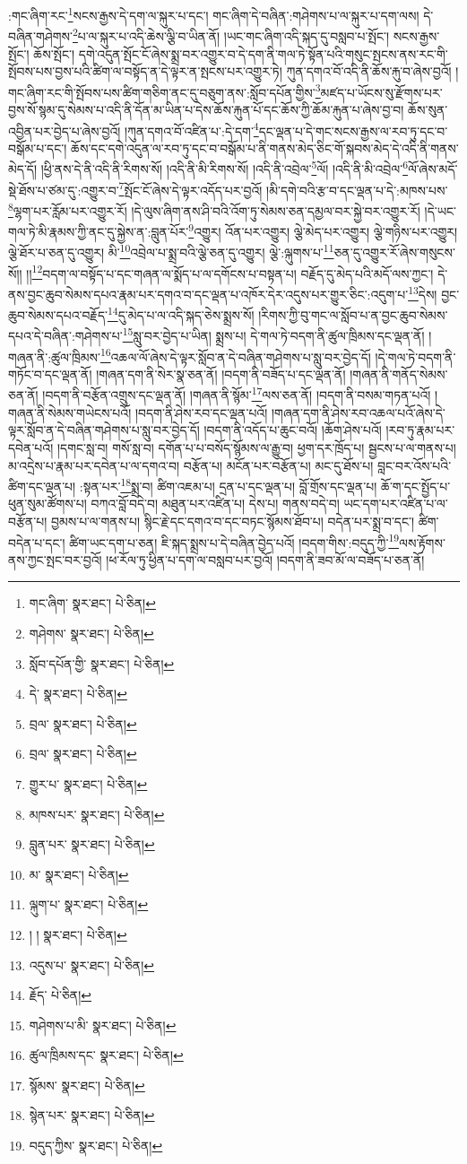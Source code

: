 :གང་ཞིག་རང་\footnote{གང་ཞིག་  སྣར་ཐང་།  པེ་ཅིན། }སངས་རྒྱས་དེ་དག་ལ་སྐུར་པ་དང་། གང་ཞིག་དེ་བཞིན་:གཤེགས་པ་ལ་སྐུར་པ་དག་ལས། དེ་བཞིན་གཤེགས་\footnote{གཤེགས་  སྣར་ཐང་།  པེ་ཅིན། }པ་ལ་སྐུར་པ་འདི་ཆེས་ལྕི་བ་ཡིན་ནོ། །ཡང་གང་ཞིག་འདི་སྐད་དུ་བསླབ་པ་སྤོང་། སངས་རྒྱས་སྤོང་། ཆོས་སྤོང་། དགེ་འདུན་སྤོང་ངོ་ཞེས་སྨྲ་བར་འགྱུར་བ་དེ་དག་ནི་གལ་ཏེ་སྟོན་པའི་གསུང་སྤངས་ནས་རང་གི་སྤོབས་པས་བྱས་པའི་ཚིག་ལ་བསྟོད་ན་དེ་ལྟར་ན་སྤངས་པར་འགྱུར་ཏེ། ཀུན་དགའ་བོ་འདི་ནི་ཆོས་རྐུ་བ་ཞེས་བྱའོ། །གང་ཞིག་རང་གི་སྤོབས་པས་ཚིག་གཅིག་ནང་དུ་བཅུག་ནས་:སློབ་དཔོན་གྱིས་\footnote{སློབ་དཔོན་གྱི་  སྣར་ཐང་།  པེ་ཅིན། }མཛད་པ་ཡོངས་སུ་རྫོགས་པར་བྱས་སོ་སྙམ་དུ་སེམས་པ་འདི་ནི་དོན་མ་ཡིན་པ་དེས་ཆོས་རྐུན་པོ་དང་ཆོས་ཀྱི་ཆོམ་རྐུན་པ་ཞེས་བྱ་བ། ཆོས་སུན་འབྱིན་པར་བྱེད་པ་ཞེས་བྱའོ། །ཀུན་དགའ་བོ་འཛིན་པ་:དེ་དག་\footnote{དེ་  སྣར་ཐང་།  པེ་ཅིན། }དང་ལྡན་པ་དེ་གང་སངས་རྒྱས་ལ་རབ་ཏུ་དང་བ་བསྒོམ་པ་དང་། ཆོས་དང་དགེ་འདུན་ལ་རབ་ཏུ་དང་བ་བསྒོམ་པ་ནི་གནས་མེད་ཅིང་གོ་སྐབས་མེད་དེ་འདི་ནི་གནས་མེད་དོ། །ཕྱི་ནས་དེ་ནི་འདི་ནི་རིགས་སོ། །འདི་ནི་མི་རིགས་སོ། །འདི་ནི་འབྲེལ་\footnote{བྲལ་  སྣར་ཐང་།  པེ་ཅིན། }ལོ། །འདི་ནི་མི་འབྲེལ་\footnote{བྲལ་  སྣར་ཐང་།  པེ་ཅིན། }ལོ་ཞེས་མདོ་སྡེ་ཐོས་པ་ཙམ་དུ་:འགྱུར་བ་\footnote{གྱུར་པ་  སྣར་ཐང་།  པེ་ཅིན། }སྤོང་ངོ་ཞེས་དེ་ལྟར་འདོད་པར་བྱའོ། །མི་དགེ་བའི་རྩ་བ་དང་ལྡན་པ་དེ་:མཁས་པས་\footnote{མཁས་པར་  སྣར་ཐང་།  པེ་ཅིན། }ལྷག་པར་རློམ་པར་འགྱུར་རོ། །དེ་ལུས་ཞིག་ནས་ཤི་བའི་འོག་ཏུ་སེམས་ཅན་དམྱལ་བར་སྐྱེ་བར་འགྱུར་རོ། །དེ་ཡང་གལ་ཏེ་མི་རྣམས་ཀྱི་ནང་དུ་སྐྱེས་ན་:བླུན་པོར་\footnote{བླུན་པར་  སྣར་ཐང་།  པེ་ཅིན། }འགྱུར། འོན་པར་འགྱུར། ལྕེ་མེད་པར་འགྱུར། ལྕེ་གཉིས་པར་འགྱུར། ལྕེ་ཐོར་པ་ཅན་དུ་འགྱུར། མི་\footnote{མ་  སྣར་ཐང་།  པེ་ཅིན། }འབྲེལ་པ་སྨྲ་བའི་ལྕེ་ཅན་དུ་འགྱུར། ལྕེ་:ལྐུགས་པ་\footnote{ལྐུག་པ་  སྣར་ཐང་།  པེ་ཅིན། }ཅན་དུ་འགྱུར་རོ་ཞེས་གསུངས་སོ།། །།\footnote{། །  སྣར་ཐང་།  པེ་ཅིན། }བདག་ལ་བསྟོད་པ་དང་གཞན་ལ་སྨོད་པ་ལ་དགོངས་པ་བསྟན་པ། བརྗོད་དུ་མེད་པའི་མདོ་ལས་ཀྱང་། དེ་ནས་བྱང་ཆུབ་སེམས་དཔའ་རྣམ་པར་དགའ་བ་དང་ལྡན་པ་འཁོར་དེར་འདུས་པར་གྱུར་ཅིང་:འདུག་པ་\footnote{འདུས་པ་  སྣར་ཐང་།  པེ་ཅིན། }དེས། བྱང་ཆུབ་སེམས་དཔའ་བརྗོད་\footnote{རྗོད་  པེ་ཅིན། }དུ་མེད་པ་ལ་འདི་སྐད་ཅེས་སྨྲས་སོ། །རིགས་ཀྱི་བུ་གང་ལ་སློབ་པ་ན་བྱང་ཆུབ་སེམས་དཔའ་དེ་བཞིན་:གཤེགས་པ་\footnote{གཤེགས་པ་མི་  སྣར་ཐང་།  པེ་ཅིན། }སླུ་བར་བྱེད་པ་ཡིན། སྨྲས་པ། དེ་གལ་ཏེ་བདག་ནི་ཚུལ་ཁྲིམས་དང་ལྡན་ནོ། །གཞན་ནི་:ཚུལ་ཁྲིམས་\footnote{ཚུལ་ཁྲིམས་དང་  སྣར་ཐང་།  པེ་ཅིན། }འཆལ་ལོ་ཞེས་དེ་ལྟར་སློབ་ན་དེ་བཞིན་གཤེགས་པ་སླུ་བར་བྱེད་དོ། །དེ་གལ་ཏེ་བདག་ནི་གཏོང་བ་དང་ལྡན་ནོ། །གཞན་དག་ནི་སེར་སྣ་ཅན་ནོ། །བདག་ནི་བཟོད་པ་དང་ལྡན་ནོ། །གཞན་ནི་གནོད་སེམས་ཅན་ནོ། །བདག་ནི་བརྩོན་འགྲུས་དང་ལྡན་ནོ། །གཞན་ནི་སྙོམ་\footnote{སྙོམས་  སྣར་ཐང་།  པེ་ཅིན། }ལས་ཅན་ནོ། །བདག་ནི་བསམ་གཏན་པའོ། །གཞན་ནི་སེམས་གཡེངས་པའོ། །བདག་ནི་ཤེས་རབ་དང་ལྡན་པའོ། །གཞན་དག་ནི་ཤེས་རབ་འཆལ་པའོ་ཞེས་དེ་ལྟར་སློབ་ན་དེ་བཞིན་གཤེགས་པ་སླུ་བར་བྱེད་དོ། །བདག་ནི་འདོད་པ་ཆུང་བའོ། །ཆོག་ཤེས་པའོ། །རབ་ཏུ་རྣམ་པར་དབེན་པའོ། །དགང་སླ་བ། གསོ་སླ་བ། དགོན་པ་པ་བསོད་སྙོམས་ལ་རྒྱུ་བ། ཕྱག་དར་ཁྲོད་པ། སྦྱངས་པ་ལ་གནས་པ། མ་འདྲེས་པ་རྣམ་པར་དབེན་པ་ལ་དགའ་བ། བརྩོན་པ། མངོན་པར་བརྩོན་པ། མང་དུ་ཐོས་པ། བླང་བར་འོས་པའི་ཚིག་དང་ལྡན་པ། :སྟན་པར་\footnote{སྙེན་པར་  སྣར་ཐང་།  པེ་ཅིན། }སྨྲ་བ། ཚིག་འཇམ་པ། དྲན་པ་དང་ལྡན་པ། བློ་གྲོས་དང་ལྡན་པ། ཆོ་ག་དང་སྤྱོད་པ་ཕུན་སུམ་ཚོགས་པ། བཀའ་བློ་བདེ་བ། མཐུན་པར་འཛིན་པ། དེས་པ། གནས་བདེ་བ། ཡང་དག་པར་འཛིན་པ་ལ་བརྩོན་པ། བྱམས་པ་ལ་གནས་པ། སྙིང་རྗེ་དང་དགའ་བ་དང་བཏང་སྙོམས་ཐོབ་པ། བདེན་པར་སྨྲ་བ་དང་། ཚིག་བདེན་པ་དང་། ཚིག་ཡང་དག་པ་ཅན། ཇི་སྐད་སྨྲས་པ་དེ་བཞིན་བྱེད་པའོ། །བདག་གིས་:བདུད་ཀྱི་\footnote{བདུད་ཀྱིས་  སྣར་ཐང་།  པེ་ཅིན། }ལས་རྟོགས་ནས་ཀྱང་སྤང་བར་བྱའོ། །ཕ་རོལ་ཏུ་ཕྱིན་པ་དག་ལ་བསླབ་པར་བྱའོ། །བདག་ནི་ཟབ་མོ་ལ་བཟོད་པ་ཅན་ནོ། 
